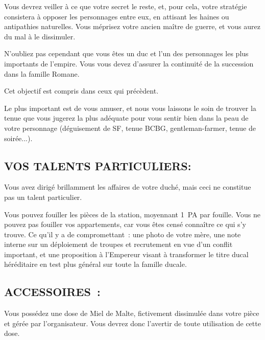 \documentclass[14pt,twocolumn]{extarticle}
\begin{document}
Vous devrez veiller à ce que votre secret le reste, et, pour cela, votre
stratégie consistera à opposer les personnages entre eux, en attisant les
haines ou antipathies naturelles. Vous méprisez votre ancien maître de guerre,
et vous aurez du mal à le dissimuler.

N'oubliez pas cependant que vous êtes un duc et l'un des personnages les plus
importants de l'empire. Vous vous devez d'assurer la continuité de la
succession dans la famille Romane.

Cet objectif est compris dans ceux qui précèdent.

Le plus important est de vous amuser, et nous vous laissons le soin de trouver
la tenue que vous jugerez la plus adéquate pour vous sentir bien dans la peau
de votre personnage (déguisement de SF, tenue BCBG, gentleman-farmer, tenue de
soirée...).

\subsection{VOS TALENTS PARTICULIERS:}

Vous avez dirigé brillamment les affaires de votre duché, mais ceci ne
constitue pas un talent particulier.

Vous pouvez fouiller les pièces de la station, moyennant 1~PA par fouille. Vous
ne pouvez pas fouiller vos appartements, car vous êtes censé connaître ce qui
s'y trouve. Ce qu'il y a de compromettant~: une photo de votre mère, une note
interne sur un déploiement de troupes et recrutement en vue d’un conflit
important, et une proposition à l’Empereur visant à transformer le titre ducal
héréditaire en test plus général sur toute la famille ducale.

\subsection{ACCESSOIRES~:}

Vous possédez une dose de Miel de Malte, fictivement dissimulée dans votre
pièce et gérée par l'organisateur. Vous devrez donc l'avertir de toute
utilisation de cette dose.
\end{document}
